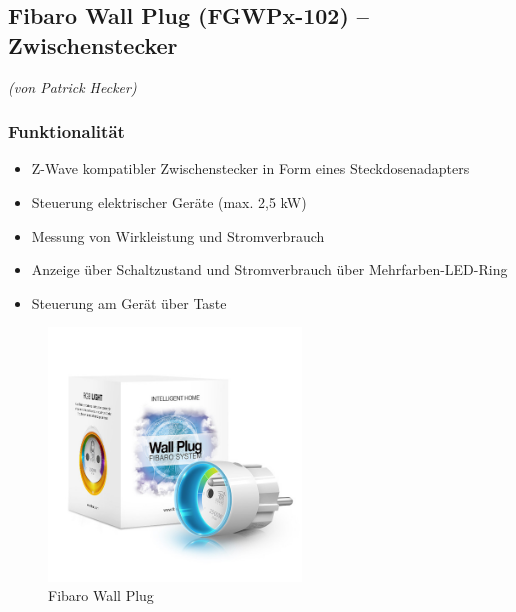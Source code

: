 

\subsection{Fibaro Wall Plug (FGWPx-102) – Zwischenstecker}
\label{subsec:fibaroWallPlug}

\emph{(von Patrick Hecker)}
\subsubsection{Funktionalität}
\begin{itemize}
	\item Z-Wave kompatibler Zwischenstecker in Form eines Steckdosenadapters
	\item Steuerung elektrischer Geräte (max. 2,5 kW)
	\item Messung von Wirkleistung und Stromverbrauch
	\item Anzeige über Schaltzustand und Stromverbrauch über Mehrfarben-LED-Ring
	\item Steuerung am Gerät über Taste
\end{itemize}

\begin{figure}[h!]
	\centering
	\includegraphics[width=0.6\textwidth]{img/Sensorevaluation/FibaroWallPlug.jpg}
	\caption{Fibaro Wall Plug}
	\label{fig:sensorenFibaroWallPlug}
\end{figure}

